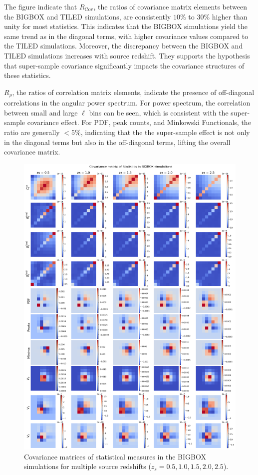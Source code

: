 The figure indicate that $R_{\text{Cov}}$, the ratios of covariance matrix elements between the BIGBOX and TILED simulations, are consistently $10\%$ to $30\%$ higher than unity for most statistics.
This indicates that the BIGBOX simulations yield the same trend as in the diagonal terms, with higher covariance values compared to the TILED simulations. Moreover, the discrepancy between the BIGBOX and TILED simulations increases with source redshift. They supports the hypothesis that super-sample covariance significantly impacts the covariance structures of these statistics. 

$R_{\rho}$, the ratios of correlation matrix elements, indicate the presence of off-diagonal correlations in the angular power spectrum. For power spectrum, the correlation between small and large $\ell$ bins can be seen, which is consistent with the super-sample covariance effect. For PDF, peak counts, and Minkowski Functionals, the ratio are generally $ < 5\%$, indicating that the the super-sample effect is not only in the diagonal terms but also in the off-diagonal terms, lifting the overall covariance matrix.

\begin{figure}[p]
    \centering
    \includegraphics[width=\textwidth]{figures/results/cov_bigbox.png}
    \caption[Covariance Matrices of Statistical Measures in BIGBOX Simulations]{Covariance matrices of statistical measures in the BIGBOX simulations for multiple source redshifts ($z_s = 0.5, 1.0, 1.5, 2.0, 2.5$).}
    \label{fig:cov_bigbox}
\end{figure}

